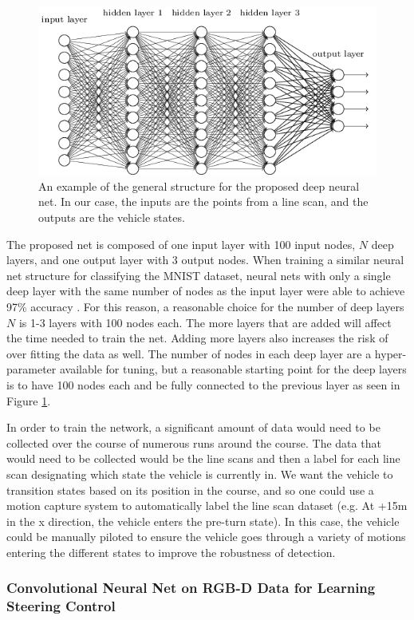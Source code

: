 \documentclass[letterpaper, 10 pt, conference]{ieeeconf}  %
\begin{document}
\begin{figure}[tp]
\begin{center}
\includegraphics[width=.48\textwidth]{Figures/nn.png}
\caption{An example of the general structure for the proposed deep neural net. In our case, the inputs are the points from a line scan, and the outputs are the vehicle states.}
\label{nn}
\end{center}
\end{figure}

The proposed net is composed of one input layer with 100 input nodes, $N$ deep layers, and one output layer with 3 output nodes. When training a similar neural net structure for classifying the MNIST dataset, neural nets with only a single deep layer with the same number of nodes as the input layer were able to achieve 97\% accuracy \cite{aurelion}. For this reason, a reasonable choice for the number of deep layers $N$ is 1-3 layers with 100 nodes each. The more layers that are added will affect the time needed to train the net. Adding more layers also increases the risk of over fitting the data as well. The number of nodes in each deep layer are a hyper-parameter available for tuning, but a reasonable starting point for the deep layers is to have 100 nodes each and be fully connected to the previous layer as seen in Figure \ref{nn}. 

In order to train the network, a significant amount of data would need to be collected over the course of numerous runs around the course. The data that would need to be collected would be the line scans and then a label for each line scan designating which state the vehicle is currently in. We want the vehicle to transition states based on its position in the course, and so one could use a motion capture system to automatically label the line scan dataset (e.g. At +15m in the x direction, the vehicle enters the pre-turn state). In this case, the vehicle could be manually piloted to ensure the vehicle goes through a variety of motions entering the different states to improve the robustness of detection. 


\subsubsection*{Convolutional Neural Net on RGB-D Data for Learning Steering Control}
\end{document}
